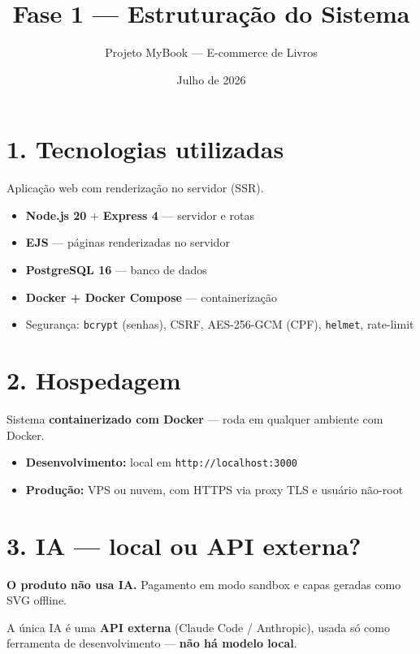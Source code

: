 \documentclass[a4paper,12pt]{article}
\title{\vspace{-1cm}Fase 1 --- Estruturação do Sistema}
\author{Projeto MyBook --- E-commerce de Livros}
\date{Julho de 2026}
\begin{document}
\maketitle
\vspace{-1.5em}

\section*{1. Tecnologias utilizadas}

Aplicação web com renderização no servidor (SSR).

\begin{itemize}[nosep]
    \item \textbf{Node.js 20} + \textbf{Express 4} --- servidor e rotas
    \item \textbf{EJS} --- páginas renderizadas no servidor
    \item \textbf{PostgreSQL 16} --- banco de dados
    \item \textbf{Docker + Docker Compose} --- containerização
    \item Segurança: \texttt{bcrypt} (senhas), CSRF, AES-256-GCM (CPF), \texttt{helmet}, rate-limit
\end{itemize}

\section*{2. Hospedagem}

Sistema \textbf{containerizado com Docker} --- roda em qualquer ambiente com Docker.

\begin{itemize}[nosep]
    \item \textbf{Desenvolvimento:} local em \texttt{http://localhost:3000}
    \item \textbf{Produção:} VPS ou nuvem, com HTTPS via proxy TLS e usuário não-root
\end{itemize}

\section*{3. IA --- local ou API externa?}

\textbf{O produto não usa IA.} Pagamento em modo sandbox e capas geradas como SVG offline.

A única IA é uma \textbf{API externa} (Claude Code / Anthropic), usada só como ferramenta
de desenvolvimento --- \textbf{não há modelo local}.
\end{document}
